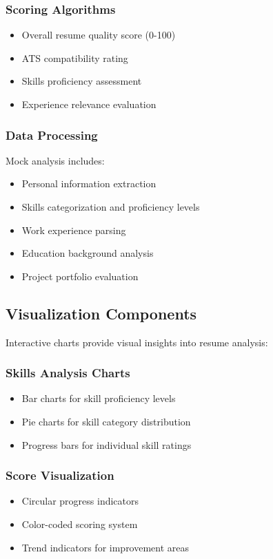 \documentclass[12pt,a4paper]{article}
\begin{document}
\subsubsection{Scoring Algorithms}
\begin{itemize}
    \item Overall resume quality score (0-100)
    \item ATS compatibility rating
    \item Skills proficiency assessment
    \item Experience relevance evaluation
\end{itemize}

\subsubsection{Data Processing}
Mock analysis includes:
\begin{itemize}
    \item Personal information extraction
    \item Skills categorization and proficiency levels
    \item Work experience parsing
    \item Education background analysis
    \item Project portfolio evaluation
\end{itemize}

\subsection{Visualization Components}
Interactive charts provide visual insights into resume analysis:

\subsubsection{Skills Analysis Charts}
\begin{itemize}
    \item Bar charts for skill proficiency levels
    \item Pie charts for skill category distribution
    \item Progress bars for individual skill ratings
\end{itemize}

\subsubsection{Score Visualization}
\begin{itemize}
    \item Circular progress indicators
    \item Color-coded scoring system
    \item Trend indicators for improvement areas
\end{itemize}
\end{document}
